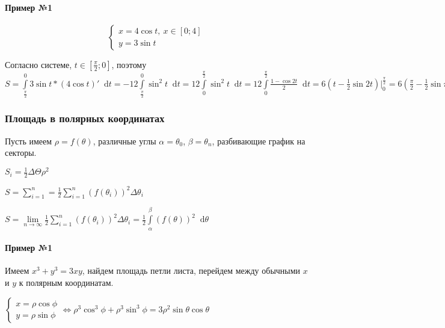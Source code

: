 \documentclass{article}
\newcommand*\diff{\mathop{}\!\mathrm{d}}
\begin{document}
\paragraph{Пример №1}

\begin{equation}
\begin{cases}
    x = 4 \cos t, \ x \in [0; 4]  \\
    y = 3 \sin t
\end{cases}
\end{equation}

Согласно системе, $t \in [\frac{\pi}{2}; 0]$, поэтому $S = \int\limits_{\frac{\pi}{2}}^{0} 3 \sin t * (4 \cos t)' \diff t = -12 \int\limits_{\frac{\pi}{2}}^{0} \sin^2 t \diff t = 12 \int\limits_{0}^{\frac{\pi}{2}} \sin^2 t \diff t = 12 \int\limits_{0}^{\frac{\pi}{2}} \frac{1 - \cos 2t}{2} \diff t = 6 (t - \frac{1}{2} \sin 2 t) \bigg|_{0}^{\frac{\pi}{2}} = 6 (\frac{\pi}{2} - \frac{1}{2} \sin \pi - 0 + 0) = 3 \pi$

\subsubsection{Площадь в полярных координатах}

Пусть имеем $\rho = f (\theta)$, различные углы $\alpha = \theta_0$, $\beta = \theta_{n}$, разбивающие график на секторы.

\hfill

$S_{i} = \frac{1}{2} \Delta \Theta \rho^2$

$S = \sum\limits_{i = 1}^{n} = \frac{1}{2} \sum\limits_{i = 1}^{n} (f(\theta_i))^2 \Delta \theta_i$

$S = \lim\limits_{n \to \infty} \frac{1}{2} \sum\limits_{i = 1}^{n} (f(\theta_i))^2 \Delta \theta_i = \frac{1}{2} \int\limits_{\alpha}^{\beta} (f(\theta))^2 \diff \theta$

\paragraph{Пример №1}

Имеем $x^3 + y^3 = 3 x y$, найдем площадь петли листа, перейдем между обычными $x$ и $y$ к полярным координатам.

$\begin{cases}
    x = \rho \cos \phi \\
    y = \rho \sin \phi
\end{cases} \Longleftrightarrow \rho^3 \cos^3 \phi + \rho^3 \sin^3 \phi = 3 \rho^2 \sin \theta \cos \theta$
\end{document}
